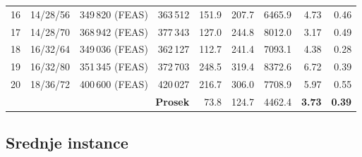 \documentclass[12pt,a4paper]{article}
\begin{document}
\begin{longtable}{r l r r r r r r r}
16 & 14/28/56 & 349\,820 (FEAS) & 363\,512 & 151.9 & 207.7 & 6465.9 & 4.73 & 0.46 \\
17 & 14/28/70 & 368\,942 (FEAS) & 377\,343 & 127.0 & 244.8 & 8012.0 & 3.17 & 0.49 \\
18 & 16/32/64 & 349\,036 (FEAS) & 362\,127 & 112.7 & 241.4 & 7093.1 & 4.38 & 0.28 \\
19 & 16/32/80 & 351\,345 (FEAS) & 372\,703 & 248.5 & 319.4 & 8372.6 & 6.72 & 0.39 \\
20 & 18/36/72 & 400\,600 (FEAS) & 420\,027 & 216.7 & 306.0 & 7708.9 & 5.97 & 0.55 \\
\midrule
\multicolumn{4}{r}{\textbf{Prosek}} & 73.8 & 124.7 & 4462.4 & \textbf{3.73} & \textbf{0.39} \\
\end{longtable}

\clearpage

\subsection{Srednje instance}
\end{document}
